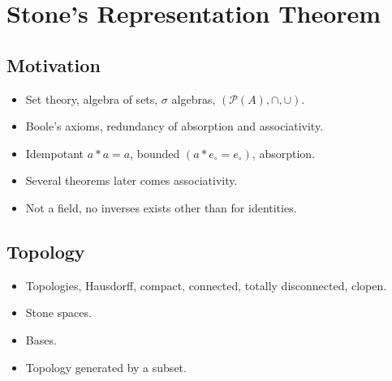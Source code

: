 \section{Stone's Representation Theorem}
    \subsection{Motivation}
        \begin{itemize}
            \item Set theory, algebra of sets, $\sigma$ algebras,
                  $(\mathcal{P}(A),\cap,\cup)$.
            \item Boole's axioms, redundancy of absorption and associativity.
            \item Idempotant $a*a=a$, bounded $(a*e_{\circ}=e_{\circ})$,
                  absorption.
            \item Several theorems later comes associativity.
            \item Not a field, no inverses exists other than for identities.
        \end{itemize}
    \subsection{Topology}
        \begin{itemize}
            \item Topologies, Hausdorff, compact, connected, totally
                disconnected, clopen.
            \item Stone spaces.
            \item Bases.
            \item Topology generated by a subset.
        \end{itemize}
